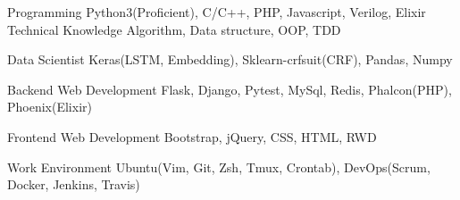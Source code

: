 

\begin{cvskills}

  \cvskill
    {Programming} %
    {Python3(Proficient), C/C++, PHP, Javascript, Verilog, Elixir} %
  \cvskill
    {Technical Knowledge} %
    {Algorithm, Data structure, OOP, TDD} %

  \cvskill
    {Data Scientist} %
    {Keras(LSTM, Embedding), Sklearn-crfsuit(CRF), Pandas, Numpy} %

  \cvskill
    {Backend Web Development} %
    {Flask, Django, Pytest, MySql, Redis, Phalcon(PHP), Phoenix(Elixir)} %

  \cvskill
    {Frontend Web Development} %
    {Bootstrap, jQuery, CSS, HTML, RWD} %

  \cvskill
    {Work Environment} %
    {Ubuntu(Vim, Git, Zsh, Tmux, Crontab), DevOps(Scrum, Docker, Jenkins, Travis)} %

\end{cvskills}
